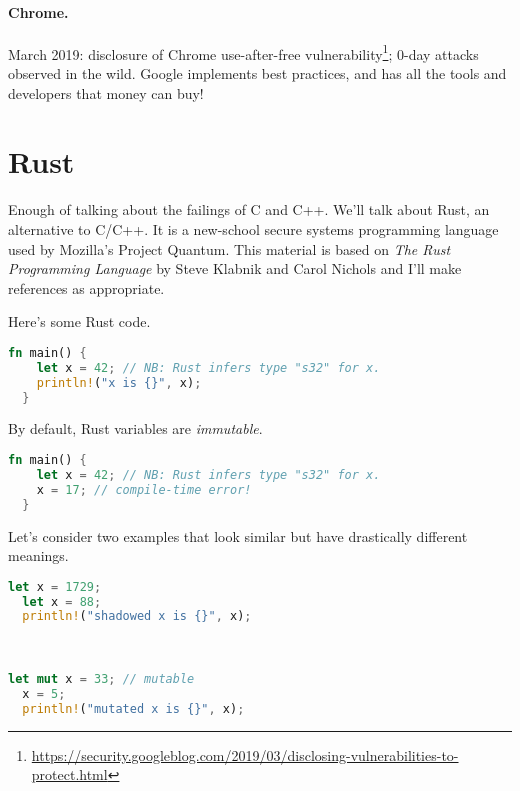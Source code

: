 \paragraph{Chrome.} March 2019: disclosure of Chrome use-after-free vulnerability\footnote{\url{https://security.googleblog.com/2019/03/disclosing-vulnerabilities-to-protect.html}}; 0-day attacks
observed in the wild. Google implements best practices, and has all the tools and developers that
money can buy!

\section*{Rust} Enough of talking about the failings of C and C++.
We'll talk about Rust, an alternative to C/C++. It is a new-school
secure systems programming language used by Mozilla's Project Quantum. This material is based
on \emph{The Rust Programming Language} by Steve Klabnik and Carol
Nichols\cite{klabnik18:_rust_progr_languag} and I'll make references as appropriate.

Here's some Rust code.
\vspace*{-.5em}
\begin{lstlisting}[language=Rust]
  fn main() {
    let x = 42; // NB: Rust infers type "s32" for x.
    println!("x is {}", x);
  }
\end{lstlisting}
By default, Rust variables are \emph{immutable}.
\vspace*{-.5em}
\begin{lstlisting}[language=Rust]
  fn main() {
    let x = 42; // NB: Rust infers type "s32" for x.
    x = 17; // compile-time error!
  }
\end{lstlisting}
Let's consider two examples that look similar but have drastically different meanings.

\vspace*{-1.5em}
\begin{minipage}{.4\textwidth}
\begin{lstlisting}[language=Rust]
  let x = 1729;
  let x = 88;
  println!("shadowed x is {}", x);
\end{lstlisting}
\end{minipage}\
\begin{minipage}{.4\textwidth}
\begin{lstlisting}[language=Rust]
  let mut x = 33; // mutable
  x = 5;
  println!("mutated x is {}", x);
\end{lstlisting}
\end{minipage}

